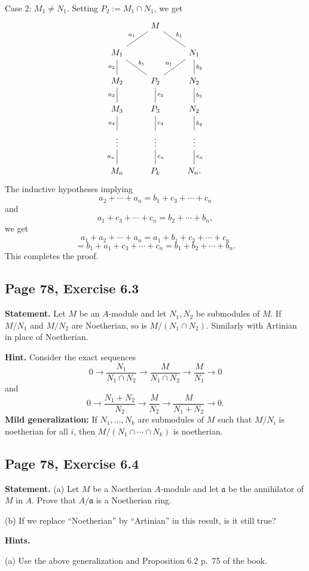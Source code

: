 \documentclass[parskip=half,fontsize=12pt]{scrartcl}%
\newcommand{\mf}{\mathfrak}
\newcommand{\aaa}{\mf a}
\begin{document}
Case 2: $M_1\ne N_1$. Setting $P_2:=M_1\cap N_1$, we get 
$$
\begin{tikzcd}
&M\ar[dl,dash,"a_1"']\ar[dr,dash,"b_1"]\\ 
M_1\ar[d,dash,"a_2"']\ar[dr,dash,"b_1"]&&N_1\ar[d,dash,"b_2"]\ar[dl,dash,"a_1"']\\ 
M_2\ar[d,dash,"a_3"']&P_2\ar[d,dash,"c_3"]&N_2\ar[d,dash,"b_3"]\\ 
M_3\ar[d,dash,"a_4"']&P_3\ar[d,dash,"c_4"]&N_2\ar[d,dash,"b_4"]\\ 
\vdots\ar[d,dash,"a_n"']&\vdots\ar[d,dash,"c_n"]&\vdots\ar[d,dash,"c_n"]\\ 
M_n&P_k&N_n.
\end{tikzcd}
$$ 
The inductive hypotheses implying 
$$
a_2+\cdots+a_n=b_1+c_3+\cdots+c_n
$$ 
and 
$$
a_1+c_3+\cdots+c_n=b_2+\cdots+b_n,%
$$ 
we get 
$$
a_1+a_2+\cdots+a_n=a_1+b_1+c_3+\cdots+c_n
$$ 
$$
=b_1+a_1+c_3+\cdots+c_n=b_1+b_2+\cdots+b_n.
$$ 
This completes the proof.

\subsection{Page 78, Exercise 6.3}%

\textbf{Statement.} Let $M$ be an $A$-module and let $N_1,N_2$ be submodules of $M$. If $M/N_1$ and $M/N_2$ are Noetherian, so is $M/(N_1\cap N_2)$. Similarly with Artinian in place of Noetherian.

\textbf{Hint.} Consider the exact sequences 
$$
0\to\frac{N_1}{N_1\cap N_2}\to\frac M{N_1\cap N_2}\to\frac M{N_1}\to0
$$ 
and 
$$
0\to\frac{N_1+N_2}{N_2}\to\frac M{N_2}\to\frac M{N_1+N_2}\to0.
$$ 
\textbf{Mild generalization:} If $N_1,\dots,N_k$ are submodules of $M$ such that $M/N_i$ is noetherian for all $i$, then $M/(N_1\cap\cdots\cap N_k)$ is noetherian. 

\subsection{Page 78, Exercise 6.4}%

\textbf{Statement.} (a) Let $M$ be a Noetherian $A$-module and let $\aaa$ be the annihilator of $M$ in $A$. Prove that $A/\aaa$ is a Noetherian ring.

(b) If we replace ``Noetherian'' by ``Artinian'' in this result, is it still true?

\textbf{Hints.}

(a) Use the above generalization and Proposition 6.2 p.~75 of the book.
\end{document}
